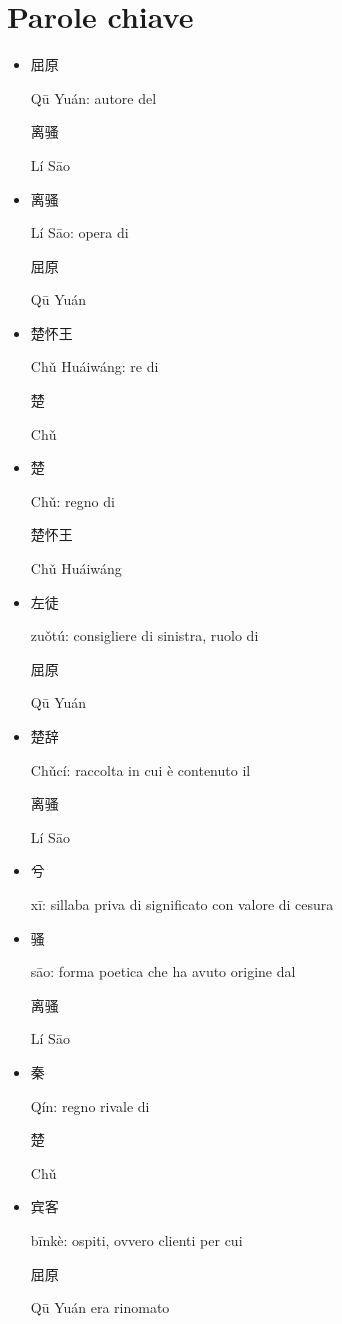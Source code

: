 \documentclass[12pt,titlepage]{article}
\begin{document}
\section{Parole chiave}
\begin{itemize}
\item \begin{CJK*}{UTF8}{gbsn}屈原\end{CJK*} Qū Yuán: autore del \begin{CJK*}{UTF8}{gbsn}离骚\end{CJK*}  Lí Sāo
\item \begin{CJK*}{UTF8}{gbsn}离骚\end{CJK*}  Lí Sāo: opera di\begin{CJK*}{UTF8}{gbsn} 屈原\end{CJK*} Qū Yuán
\item \begin{CJK*}{UTF8}{gbsn}楚怀王\end{CJK*} Chǔ Huáiwáng: re di \begin{CJK*}{UTF8}{gbsn}楚\end{CJK*}  Chǔ
\item \begin{CJK*}{UTF8}{gbsn}楚\end{CJK*}  Chǔ: regno di \begin{CJK*}{UTF8}{gbsn}楚怀王\end{CJK*} Chǔ Huáiwáng
\item \begin{CJK*}{UTF8}{gbsn}左徒 \end{CJK*} zuǒtú:  consigliere di sinistra, ruolo di \begin{CJK*}{UTF8}{gbsn}屈原\end{CJK*} Qū Yuán
\item \begin{CJK*}{UTF8}{gbsn}楚辞 \end{CJK*} Chǔcí: raccolta in cui è contenuto il \begin{CJK*}{UTF8}{gbsn}离骚\end{CJK*} Lí Sāo
\item\begin{CJK*}{UTF8}{gbsn} 兮\end{CJK*}  xī: sillaba priva di significato con valore di cesura
\item\begin{CJK*}{UTF8}{gbsn} 骚 \end{CJK*} sāo: forma poetica che ha avuto origine dal\begin{CJK*}{UTF8}{gbsn} 离骚\end{CJK*}  Lí Sāo
\item \begin{CJK*}{UTF8}{gbsn}秦 \end{CJK*} Qín: regno rivale di\begin{CJK*}{UTF8}{gbsn} 楚 \end{CJK*} Chǔ
\item \begin{CJK*}{UTF8}{gbsn}宾客 \end{CJK*} bīnkè: ospiti, ovvero clienti per cui \begin{CJK*}{UTF8}{gbsn}屈原\end{CJK*} Qū Yuán era rinomato
\end{itemize}
\end{document}

